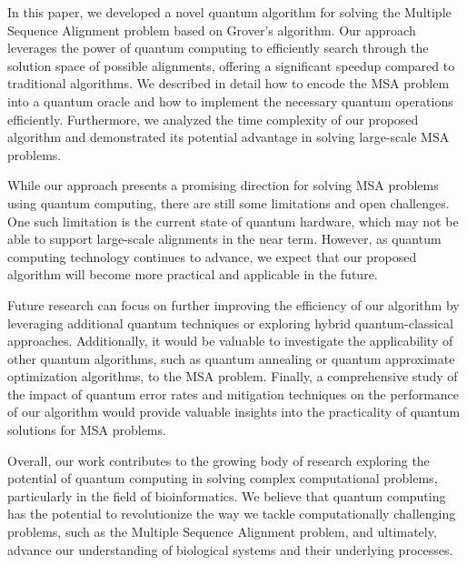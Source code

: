 In this paper, we developed a novel quantum algorithm for solving the Multiple Sequence Alignment problem based on Grover's algorithm. Our approach leverages the power of quantum computing to efficiently search through the solution space of possible alignments, offering a significant speedup compared to traditional algorithms. We described in detail how to encode the MSA problem into a quantum oracle and how to implement the necessary quantum operations efficiently. Furthermore, we analyzed the time complexity of our proposed algorithm and demonstrated its potential advantage in solving large-scale MSA problems.

While our approach presents a promising direction for solving MSA problems using quantum computing, there are still some limitations and open challenges. One such limitation is the current state of quantum hardware, which may not be able to support large-scale alignments in the near term. However, as quantum computing technology continues to advance, we expect that our proposed algorithm will become more practical and applicable in the future.

Future research can focus on further improving the efficiency of our algorithm by leveraging additional quantum techniques or exploring hybrid quantum-classical approaches. Additionally, it would be valuable to investigate the applicability of other quantum algorithms, such as quantum annealing or quantum approximate optimization algorithms, to the MSA problem. Finally, a comprehensive study of the impact of quantum error rates and mitigation techniques on the performance of our algorithm would provide valuable insights into the practicality of quantum solutions for MSA problems.

Overall, our work contributes to the growing body of research exploring the potential of quantum computing in solving complex computational problems, particularly in the field of bioinformatics. We believe that quantum computing has the potential to revolutionize the way we tackle computationally challenging problems, such as the Multiple Sequence Alignment problem, and ultimately, advance our understanding of biological systems and their underlying processes.

